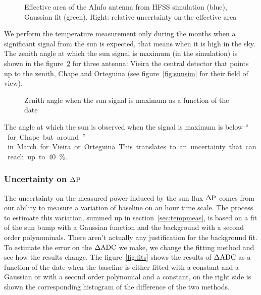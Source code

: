 \begin{figure}[!ht]
 \centering
 \hspace*{-3ex}
 \caption{Effective  area of  the AInfo  antenna from  HFSS simulation
   (blue), Gaussian  fit (green).  Right: relative uncertainty  on the
   effective area}
 \label{fig:aeffuncert}
\end{figure}
We perform the  temperature measurement only during the  months when a
significant signal  from the  sun is expected,  that means when  it is
high in the  sky. The zenith angle at which the  sun signal is maximum
(in the  simulation) is shown in  the figure~\ref{fig:zenithofmax} for
three  antenna: Vieira  the central  detector  that points  up to  the
zenith,  Chape and  Orteguina (see  figure~\ref{fig:sunsim}  for their
field of view).
\begin{figure}[!ht]
 \centering
 \hspace*{-3ex}
 \caption{Zenith angle when the sun signal is maximum as a function of
   the date}
 \label{fig:zenithofmax}
\end{figure}
The angle at  which the sun is observed when the  signal is maximum is
below  \unit[10]{$\rm  ^{\circ}$} for  Chape  but  around \unit[15  to
  20]{$\rm  ^{\circ}$}   in  March  for  Vieira   or  Orteguina.  This
translates to an uncertainty that can reach up to 40\%.


\subsubsection{Uncertainty on $\rm \Delta P$}
The uncertainty  on the  measured power induced  by the sun  flux $\rm
\Delta P$ comes from our ability to measure a variation of baseline on
an hour time scale.  The process to estimate this variation, summed up
in section~\ref{sec:tempmeas}, is based on  a fit of the sun bump with
a  Gaussian   function  and  the   background  with  a   second  order
polynominals.   There  aren't   actually  any  justification  for  the
background fit. To estimate the error on the $\rm \Delta ADC$ we make,
we  change the fitting  method and  see how  the results  change.  The
figure~\ref{fig:fits}  shows the  results  of $\rm  \Delta  ADC$ as  a
function  of  the date  when  the baseline  is  either  fitted with  a
constant  and a  Gaussian  or with  a  second order  polynomial and  a
constant, on  the right side  is shown the corresponding  histogram of
the difference of the two methods.
